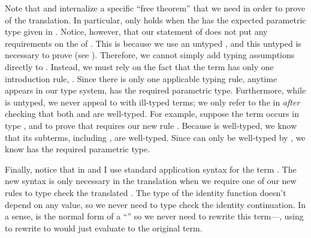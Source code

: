 Note that  and  internalize
a specific ``free theorem'' that we need in order to prove  of the  translation.
In particular,  only holds when the
  \im{\cpseone} has the expected parametric type
\im{\cpspity{\cpsalpha}{\cpsstarty}{\cpsfunty{(\cpsfunty{\cpsA}{\cpsalpha})}{\cpsalpha}}} given in
.
Notice, however, that our statement of  does not put
any requirements on the  of \im{\cpseone}.
This is because we use an untyped , and this untyped
 is necessary to prove  (see
).
Therefore, we cannot simply add typing assumptions directly to
.
Instead, we must rely on the fact that the term
\im{\cpscappe{\cpse}{\cpsA}{\cpsepr}} has only one introduction rule,
.
Since there is only one applicable typing rule, anytime
\im{\cpscappe{\cpse}{\cpsA}{\cpsepr}} appears
in our type system, \im{\cpse} has the required parametric type.
Furthermore, while  is untyped, we never appeal to 
with ill-typed terms; we only refer to the  \im{\cpsApr \equiv
  \cpsBpr} in  \emph{after} checking that both \im{\cpsApr} and
\im{\cpsBpr} are well-typed.
For example, suppose the term \im{\cpscappe{\cpse}{\cpsA}{\cpsepr}} occurs in
type \im{\cpsApr}, and to prove that \im{\cpsApr \equiv \cpsBpr} requires our
new rule .
Because \im{\cpsApr} is well-typed, we know that its subterms, including
\im{\cpscappe{\cpse}{\cpsA}{\cpsepr}}, are well-typed.
Since \im{\cpscappe{\cpse}{\cpsA}{\cpsepr}} can only be well-typed by
, we know \im{\cpse} has the required parametric type.

Finally, notice that in  and
 I use standard application syntax for the
term \im{\cpsncappe{\cpse}{\cpsB}{\cpsidk}}.
The new  syntax is only necessary in the  translation
when we require one of our new rules to type check the translated .
The type of the identity function doesn't depend on any value, so we never need
 to type check the identity continuation.
In a sense, \im{{\cpsncappe{\cpse}{\cpsB}{\cpsidk}}} is the normal form of a
 ``'' so we never need
 to rewrite this term---\ie, using
 to rewrite
\im{{\cpsncappe{\cpse}{\cpsB}{\cpsidk}}} to
\im{\cpsappe{\cpsidk}{(\cpsncappe{\cpse}{\cpsB}{\cpsidk})}} would just
evaluate to the original term.

